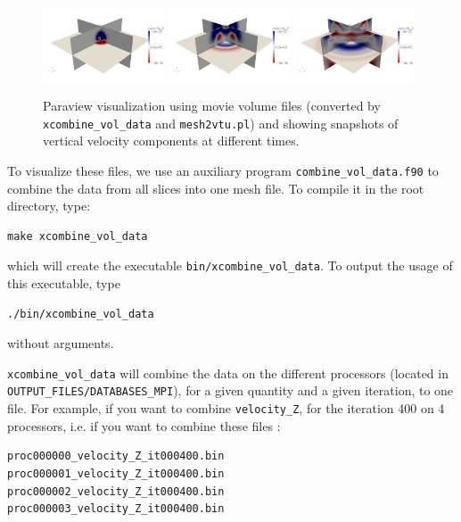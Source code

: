 \begin{figure}[htbp]
\begin{centering}
\includegraphics[width=0.32\textwidth]{figures/movie_volume_1.jpg}
\includegraphics[width=0.32\textwidth]{figures/movie_volume_2.jpg}
\includegraphics[width=0.32\textwidth]{figures/movie_volume_3.jpg}
\par
\end{centering}
\caption{Paraview visualization using movie volume files (converted by \texttt{xcombine\_vol\_data}
and \texttt{mesh2vtu.pl}) and showing snapshots of vertical velocity
components at different times.}
\label{fig:movie.volume}
\end{figure}


To visualize these files, we use an auxiliary program \texttt{combine\_vol\_data.f90}
to combine the data from all slices into one mesh file. To compile
it in the root directory, type:

{\footnotesize
\begin{verbatim}
make xcombine_vol_data
\end{verbatim}
}
\noindent
which will create the executable \texttt{bin/xcombine\_vol\_data}.
To output the usage of this executable, type

{\footnotesize
\begin{verbatim}
./bin/xcombine_vol_data
\end{verbatim}
}
\noindent
without arguments.

\medskip

\texttt{xcombine\_vol\_data} will combine the data on the different processors (located in \texttt{OUTPUT\_FILES/DATABASES\_MPI}), for a given quantity and a given iteration, to one file. For example, if you want to combine \texttt{velocity\_Z}, for the iteration 400 on 4 processors, i.e. if you want to combine these files :
{\small
\begin{verbatim}
proc000000_velocity_Z_it000400.bin
proc000001_velocity_Z_it000400.bin
proc000002_velocity_Z_it000400.bin
proc000003_velocity_Z_it000400.bin
\end{verbatim}
}

